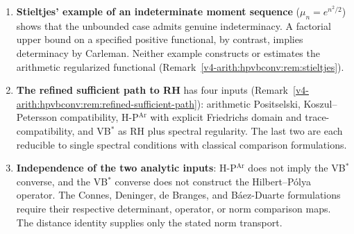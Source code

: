 \begin{enumerate}
rigorous identification requires the regularisation matching
\eqref{v4-arith:hpvbconv:eq:BC-trace-condition}.
\item \textbf{Stieltjes' example of an indeterminate moment sequence}
(\(\mu_{n}=e^{n^{2}/2}\)) shows that the unbounded case admits genuine
indeterminacy. A factorial upper bound on a specified positive
functional, by contrast, implies determinacy by Carleman. Neither
example constructs or estimates the arithmetic regularized functional
(Remark~\ref{v4-arith:hpvbconv:rem:stieltjes}).
\item \textbf{The refined sufficient path to RH} has four inputs
(Remark~\ref{v4-arith:hpvbconv:rem:refined-sufficient-path}): arithmetic
Positselski, Koszul--Petersson compatibility, H-P\(^{\mathrm{Ar}}\)
with explicit Friedrichs domain and trace-compatibility, and VB\(^{*}\)
as RH plus spectral regularity. The last two are each reducible to
single spectral conditions with classical comparison formulations.
\item \textbf{Independence of the two analytic inputs}: H-P\(^{\mathrm{Ar}}\)
does not imply the VB\(^{*}\) converse, and the VB\(^{*}\) converse
does not construct the Hilbert--P\'olya operator.  The Connes, Deninger, de Branges, and B\'aez-Duarte formulations
require their respective determinant, operator, or norm comparison
maps. The distance identity supplies only the stated norm transport.
\end{enumerate}
